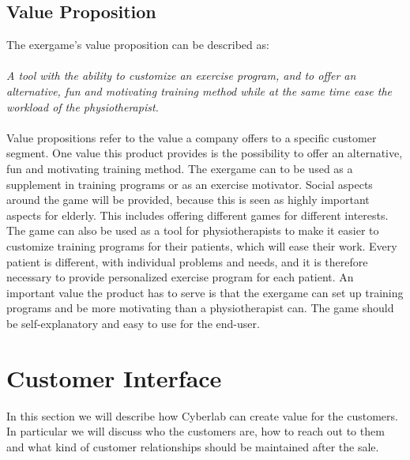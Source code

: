 \subsection{Value Proposition}
The exergame's value proposition can be described as: \\ \\
\emph{A tool with the ability to customize an exercise program, and to offer an alternative, fun and motivating training method while at the same time ease the workload of the physiotherapist.}\\ \\
Value propositions refer to the value a company offers to a specific customer segment. One value this product provides is the possibility to offer an alternative, fun and motivating training method. The exergame can to be used as a supplement in training programs or as an exercise motivator. Social aspects around the game will be provided, because this is seen as highly important aspects for elderly. This includes offering different games for different interests. The game can also be used as a tool for physiotherapists to make it easier to customize training programs for their patients, which will ease their work. Every patient is different, with individual problems and needs, and it is therefore necessary to provide personalized exercise program for each patient. An important value the product has to serve is that the exergame can set up training programs and be more motivating than a physiotherapist can. The game should be self-explanatory and easy to use for the end-user.
\section{Customer Interface}
In this section we will describe how Cyberlab can create value for the customers. In particular we will discuss who the customers are, how to reach out to them and what kind of customer relationships should be maintained after the sale. 
